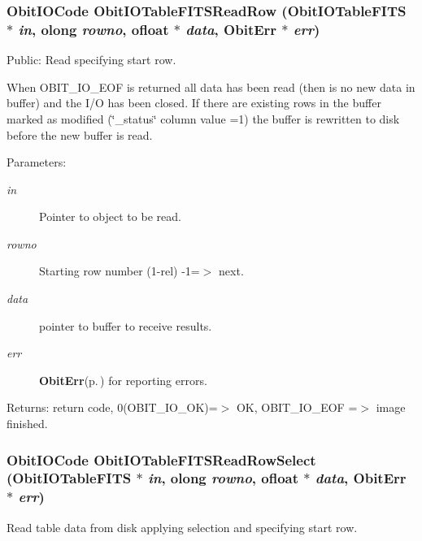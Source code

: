 \subsubsection{\setlength{\rightskip}{0pt plus 5cm}Obit\-IOCode Obit\-IOTable\-FITSRead\-Row ({\bf Obit\-IOTable\-FITS} $\ast$ {\em in}, {\bf olong} {\em rowno}, {\bf ofloat} $\ast$ {\em data}, {\bf Obit\-Err} $\ast$ {\em err})}\label{ObitIOTableFITS_8c_a21}


Public: Read specifying start row. 

When OBIT\_\-IO\_\-EOF is returned all data has been read (then is no new data in buffer) and the I/O has been closed. If there are existing rows in the buffer marked as modified (\char`\"{}\_\-status\char`\"{} column value =1) the buffer is rewritten to disk before the new buffer is read. \begin{Desc}
\item[Parameters:]
\begin{description}
\item[{\em in}]Pointer to object to be read. \item[{\em rowno}]Starting row number (1-rel) -1=$>$ next. \item[{\em data}]pointer to buffer to receive results. \item[{\em err}]{\bf Obit\-Err}{\rm (p.\,\pageref{structObitErr})} for reporting errors. \end{description}
\end{Desc}
\begin{Desc}
\item[Returns:]return code, 0(OBIT\_\-IO\_\-OK)=$>$ OK, OBIT\_\-IO\_\-EOF =$>$ image finished. \end{Desc}
\subsubsection{\setlength{\rightskip}{0pt plus 5cm}Obit\-IOCode Obit\-IOTable\-FITSRead\-Row\-Select ({\bf Obit\-IOTable\-FITS} $\ast$ {\em in}, {\bf olong} {\em rowno}, {\bf ofloat} $\ast$ {\em data}, {\bf Obit\-Err} $\ast$ {\em err})}\label{ObitIOTableFITS_8c_a23}


Read table data from disk applying selection and specifying start row. 

